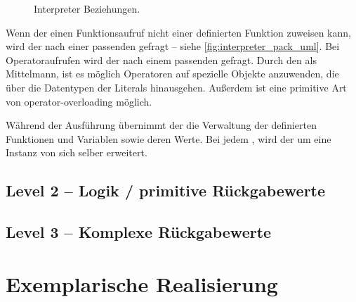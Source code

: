       \begin{figure}[H]
        \centering
        \caption{Interpreter Beziehungen.}
        \label{fig:interpreter_pack_uml}
      \end{figure}

      Wenn der  einen Funktionsaufruf nicht einer definierten Funktion zuweisen kann, wird der  nach einer passenden  gefragt -- siehe \autoref{fig:interpreter_pack_uml}. Bei Operatoraufrufen wird der  nach einem passenden  gefragt. Durch den  als Mittelmann, ist es möglich Operatoren auf spezielle Objekte anzuwenden, die über die Datentypen der Literals hinausgehen. Außerdem ist eine primitive Art von operator-overloading möglich.

      Während der Ausführung übernimmt der  die Verwaltung der definierten Funktionen und Variablen sowie deren Werte. Bei jedem , wird der  um eine Instanz von sich selber erweitert.


  \subsection{Level 2 -- Logik / primitive Rückgabewerte}
  \label{ssec:Level 2 -- Logik / primitive Rückgabewerte}

  \subsection{Level 3 -- Komplexe Rückgabewerte}
  \label{ssec:Level 3 -- Komplexe Rückgabewerte}

\section{Exemplarische Realisierung}
\label{sec:Exemplarische Realisierung}

